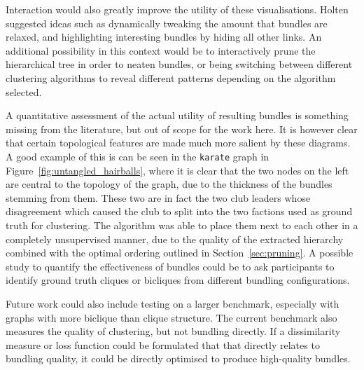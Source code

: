 Interaction would also greatly improve the utility of these visualisations. Holten \cite{Holten2006} suggested ideas such as dynamically tweaking the amount that bundles are relaxed, and highlighting interesting bundles by hiding all other links. An additional possibility in this context would be to interactively prune the hierarchical tree in order to neaten bundles, or being switching between different clustering algorithms to reveal different patterns depending on the algorithm selected.

A quantitative assessment of the actual utility of resulting bundles is something missing from the literature, but out of scope for the work here.
It is however clear that certain topological features are made much more salient by these diagrams. A good example of this is can be seen in the \texttt{karate} graph in Figure~\ref{fig:untangled_hairballs}, where it is clear that the two nodes on the left are central to the topology of the graph, due to the thickness of the bundles stemming from them. These two are in fact the two club leaders whose disagreement which caused the club to split into the two factions used as ground truth for clustering. The algorithm was able to place them next to each other in a completely unsupervised manner, due to the quality of the extracted hierarchy combined with the optimal ordering \cite{Bar-Joseph2001} outlined in Section~\ref{sec:pruning}.
A possible study to quantify the effectiveness of bundles could be to ask participants to identify ground truth cliques or bicliques from different bundling configurations.

Future work could also include testing on a larger benchmark, especially with graphs with more biclique than clique structure.
The current benchmark also measures the quality of clustering, but not bundling directly. If a dissimilarity measure or loss function could be formulated that that directly relates to bundling quality, it could be directly optimised to produce high-quality bundles.


